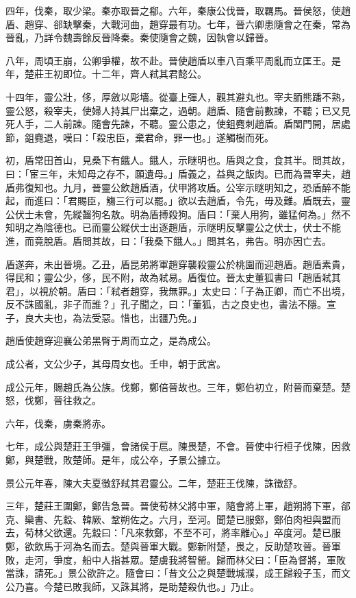 \begin{pinyinscope}
四年，伐秦，取少梁。秦亦取晉之郩。六年，秦康公伐晉，取羈馬。晉侯怒，使趙盾、趙穿、郤缺擊秦，大戰河曲，趙穿最有功。七年，晉六卿患隨會之在秦，常為晉亂，乃詳令魏壽餘反晉降秦。秦使隨會之魏，因執會以歸晉。

八年，周頃王崩，公卿爭權，故不赴。晉使趙盾以車八百乘平周亂而立匡王。是年，楚莊王初即位。十二年，齊人弒其君懿公。

十四年，靈公壯，侈，厚斂以彫墻。從臺上彈人，觀其避丸也。宰夫胹熊蹯不熟，靈公怒，殺宰夫，使婦人持其尸出棄之，過朝。趙盾、隨會前數諫，不聽；已又見死人手，二人前諫。隨會先諫，不聽。靈公患之，使鉏麑刺趙盾。盾閨門開，居處節，鉏麑退，嘆曰：「殺忠臣，棄君命，罪一也。」遂觸樹而死。

初，盾常田首山，見桑下有餓人。餓人，示瞇明也。盾與之食，食其半。問其故，曰：「宦三年，未知母之存不，願遺母。」盾義之，益與之飯肉。已而為晉宰夫，趙盾弗復知也。九月，晉靈公飲趙盾酒，伏甲將攻盾。公宰示瞇明知之，恐盾醉不能起，而進曰：「君賜臣，觴三行可以罷。」欲以去趙盾，令先，毋及難。盾既去，靈公伏士未會，先縱齧狗名敖。明為盾搏殺狗。盾曰：「棄人用狗，雖猛何為。」然不知明之為陰德也。已而靈公縱伏士出逐趙盾，示瞇明反擊靈公之伏士，伏士不能進，而竟脫盾。盾問其故，曰：「我桑下餓人。」問其名，弗告。明亦因亡去。

盾遂奔，未出晉境。乙丑，盾昆弟將軍趙穿襲殺靈公於桃園而迎趙盾。趙盾素貴，得民和；靈公少，侈，民不附，故為弒易。盾復位。晉太史董狐書曰「趙盾弒其君」，以視於朝。盾曰：「弒者趙穿，我無罪。」太史曰：「子為正卿，而亡不出境，反不誅國亂，非子而誰？」孔子聞之，曰：「董狐，古之良史也，書法不隱。宣子，良大夫也，為法受惡。惜也，出疆乃免。」

趙盾使趙穿迎襄公弟黑臀于周而立之，是為成公。

成公者，文公少子，其母周女也。壬申，朝于武宮。

成公元年，賜趙氏為公族。伐鄭，鄭倍晉故也。三年，鄭伯初立，附晉而棄楚。楚怒，伐鄭，晉往救之。

六年，伐秦，虜秦將赤。

七年，成公與楚莊王爭彊，會諸侯于扈。陳畏楚，不會。晉使中行桓子伐陳，因救鄭，與楚戰，敗楚師。是年，成公卒，子景公據立。

景公元年春，陳大夫夏徵舒弒其君靈公。二年，楚莊王伐陳，誅徵舒。

三年，楚莊王圍鄭，鄭告急晉。晉使荀林父將中軍，隨會將上軍，趙朔將下軍，郤克、欒書、先縠、韓厥、鞏朔佐之。六月，至河。聞楚已服鄭，鄭伯肉袒與盟而去，荀林父欲還。先縠曰：「凡來救鄭，不至不可，將率離心。」卒度河。楚已服鄭，欲飲馬于河為名而去。楚與晉軍大戰。鄭新附楚，畏之，反助楚攻晉。晉軍敗，走河，爭度，船中人指甚眾。楚虜我將智罃。歸而林父曰：「臣為督將，軍敗當誅，請死。」景公欲許之。隨會曰：「昔文公之與楚戰城濮，成王歸殺子玉，而文公乃喜。今楚已敗我師，又誅其將，是助楚殺仇也。」乃止。


\end{pinyinscope}
